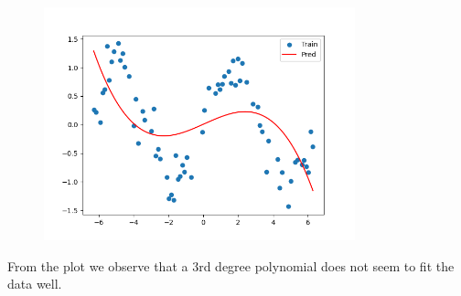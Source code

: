 \begin{answer}
\begin{figure}[H]
    \centering
    \includegraphics[width=9cm]{featuremaps/Prob_2_b.png}
\end{figure}
From the plot we observe that a 3rd degree polynomial does not seem to fit the data well.
\end{answer}
